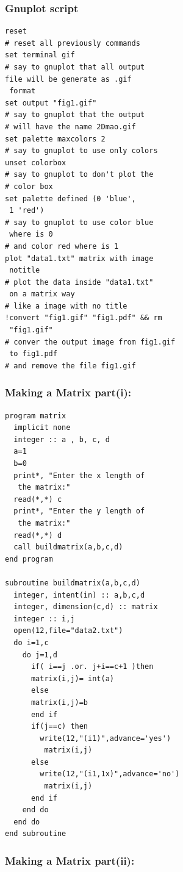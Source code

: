 \documentclass[twocolumn]{article}
\begin{document}
\subsubsection{Gnuplot script}

\begin{verbatim}
reset 
# reset all previously commands
set terminal gif
# say to gnuplot that all output 
file will be generate as .gif
 format
set output "fig1.gif"
# say to gnuplot that the output 
# will have the name 2Dmao.gif 
set palette maxcolors 2
# say to gnuplot to use only colors
unset colorbox
# say to gnuplot to don't plot the
# color box
set palette defined (0 'blue',
 1 'red')
# say to gnuplot to use color blue
 where is 0
# and color red where is 1
plot "data1.txt" matrix with image
 notitle
# plot the data inside "data1.txt"
 on a matrix way
# like a image with no title
!convert "fig1.gif" "fig1.pdf" && rm
 "fig1.gif"
# conver the output image from fig1.gif
 to fig1.pdf
# and remove the file fig1.gif
\end{verbatim}\label{plotting first graphic}

\subsubsection{Making a Matrix part(i):}

\begin{verbatim}
program matrix
  implicit none
  integer :: a , b, c, d
  a=1
  b=0
  print*, "Enter the x length of
   the matrix:"
  read(*,*) c
  print*, "Enter the y length of
   the matrix:"
  read(*,*) d
  call buildmatrix(a,b,c,d)
end program

subroutine buildmatrix(a,b,c,d)
  integer, intent(in) :: a,b,c,d
  integer, dimension(c,d) :: matrix
  integer :: i,j
  open(12,file="data2.txt")
  do i=1,c
    do j=1,d
      if( i==j .or. j+i==c+1 )then
      matrix(i,j)= int(a)
      else 
      matrix(i,j)=b
      end if
      if(j==c) then 
        write(12,"(i1)",advance='yes')
         matrix(i,j)
      else
        write(12,"(i1,1x)",advance='no')
         matrix(i,j)
      end if
    end do
  end do
end subroutine
\end{verbatim}\label{writing first matrix}

\subsubsection{Making a Matrix part(ii):}
\end{document}
